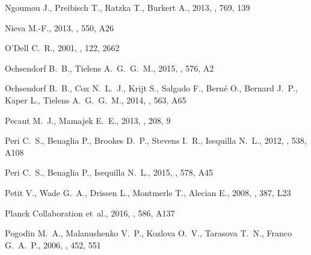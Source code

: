 \documentclass[useAMS, usenatbib, a4paper]{mnras}
\begin{document}
\begin{thebibliography}{}
{Ngoumou} J.,  {Preibisch} T.,  {Ratzka} T.,   {Burkert} A.,  2013, \apj, 769,
  139

{Nieva} M.-F.,  2013, \aap, 550, A26

{O'Dell} C.~R.,  2001, \aj, 122, 2662

{Ochsendorf} B.~B.,  {Tielens} A.~G.~G.~M.,  2015, \aap, 576, A2

{Ochsendorf} B.~B.,  {Cox} N.~L.~J.,  {Krijt} S.,  {Salgado} F.,  {Bern{\'e}}
  O.,  {Bernard} J.~P.,  {Kaper} L.,   {Tielens} A.~G.~G.~M.,  2014, \aap, 563,
  A65

{Pecaut} M.~J.,  {Mamajek} E.~E.,  2013, \apjs, 208, 9

{Peri} C.~S.,  {Benaglia} P.,  {Brookes} D.~P.,  {Stevens} I.~R.,   {Isequilla}
  N.~L.,  2012, \aap, 538, A108

{Peri} C.~S.,  {Benaglia} P.,   {Isequilla} N.~L.,  2015, \aap, 578, A45

{Petit} V.,  {Wade} G.~A.,  {Drissen} L.,  {Montmerle} T.,   {Alecian} E.,
  2008, \mnras, 387, L23

{Planck Collaboration} et~al., 2016, \aap, 586, A137

{Pogodin} M.~A.,  {Malanushenko} V.~P.,  {Kozlova} O.~V.,  {Tarasova} T.~N.,
  {Franco} G.~A.~P.,  2006, \aap, 452, 551


\end{thebibliography}
\end{document}
